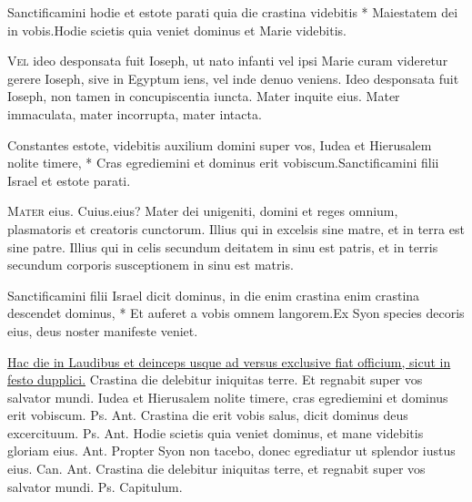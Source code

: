 \begin{multicols*}{2}
\begin{responsory}
{Sanctificamini hodie et estote parati quia die crastina videbitis * Maiestatem dei in vobis.}{Hodie scietis quia veniet dominus et Marie videbitis.}
\end{responsory}
\lettrine[lines=2]{\zallmancaps \color{Blue} V}{el} ideo desponsata fuit Ioseph, ut nato infanti vel ipsi Marie curam videretur gerere Ioseph, sive in Egyptum iens, vel inde denuo veniens. Ideo desponsata fuit Ioseph, non tamen in concupiscentia iuncta. Mater inquite eius. Mater immaculata, mater incorrupta, mater intacta.
\begin{responsory}
{Constantes estote, videbitis auxilium domini super vos, Iudea et Hierusalem nolite timere, * Cras egrediemini et dominus erit vobiscum.}{Sanctificamini filii Israel et estote parati.}
\end{responsory}
\lettrine[lines=2]{\zallmancaps \color{Red} M}{ater} eius. Cuius.eius? Mater dei unigeniti, domini et reges omnium, plasmatoris et creatoris cunctorum. Illius qui in excelsis sine matre, et in terra est sine patre. Illius qui in celis secundum deitatem in sinu est patris, et in terris secundum corporis susceptionem in sinu est matris.
\begin{responsory-doxology}
{Sanctificamini filii Israel dicit dominus, in die enim crastina enim crastina descendet dominus, * Et auferet a vobis omnem langorem.}{Ex Syon species decoris eius, deus noster manifeste veniet.}
\end{responsory-doxology}
\newline \ul{Hac die in Laudibus et deinceps usque ad versus exclusive fiat officium, sicut in festo dupplici.}
\newline \V Crastina die delebitur iniquitas terre.
\newline \R Et regnabit super vos salvator mundi.
 Iudea et Hierusalem nolite timere, cras egrediemini et dominus erit vobiscum. {\color{Red} Ps.}  {\color{Red} Ant.} Crastina die erit vobis salus, dicit dominus deus excercituum. {\color{Red} Ps.}  {\color{Red} Ant.} Hodie scietis quia veniet dominus, et mane videbitis gloriam eius.  {\color{Red} Ant.} Propter Syon non tacebo, donec egrediatur ut splendor iustus eius. {\color{Red} Can.}  {\color{Red} Ant.} Crastina die delebitur iniquitas terre, et regnabit super vos salvator mundi. {\color{Red} Ps.}  {\color{Red} Capitulum.}

\end{multicols*}
